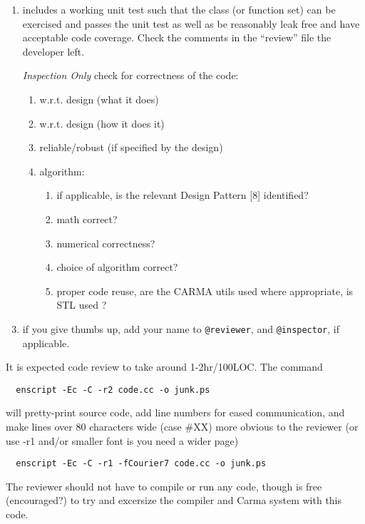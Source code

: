 \documentclass{article}
\begin{document}
\begin{enumerate}
\item
  includes a working unit test such that the class (or function set) 
  can be exercised and passes the unit test as well as be 
  reasonably leak free and have acceptable code coverage.
Check the comments in the ``review'' file the developer left.

\item [{\it Inspection Only}]
  check for correctness of the code:
  \begin{enumerate}
  \item
    w.r.t. design (what it does)
  \item
    w.r.t. design (how it does it)
  \item
    reliable/robust (if specified by the design)
  \item
    algorithm:
    \begin{enumerate}
    \item
      if applicable, is the relevant Design Pattern [8] identified? 
    \item
      math correct?
    \item
      numerical correctness?
    \item
      choice of algorithm correct?
    \item
      proper code reuse, are the CARMA utils used where appropriate, is STL used ?
    \end{enumerate}
  \end{enumerate}
\item
  if you give thumbs up, add your name to {\tt @reviewer}, and 
{\tt @inspector}, if applicable.
\end{enumerate}

It is expected code review to take around 1-2hr/100LOC.
The command
\begin{verbatim}
  enscript -Ec -C -r2 code.cc -o junk.ps
\end{verbatim}
will pretty-print source code, add line numbers for eased communication, 
and make lines over 80 characters wide (case \#XX) more obvious to the
reviewer (or use -r1 and/or smaller font is you need a wider page)
\begin{verbatim}
  enscript -Ec -C -r1 -fCourier7 code.cc -o junk.ps
\end{verbatim}
The reviewer should not have to compile or run any code, though is free 
(encouraged?) to try and excersize the compiler and Carma system with this code.
 \newpage

\end{document}
